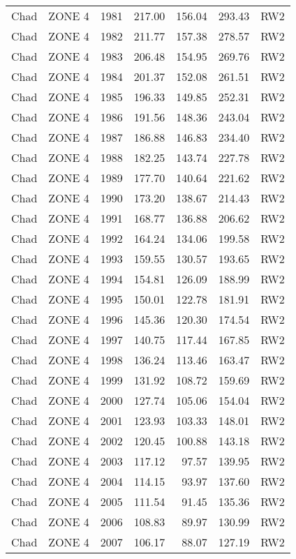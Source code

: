 \begin{longtable}{lllrrrl}
  Chad & ZONE 4 & 1981 & 217.00 & 156.04 & 293.43 & RW2 \\ 
  Chad & ZONE 4 & 1982 & 211.77 & 157.38 & 278.57 & RW2 \\ 
  Chad & ZONE 4 & 1983 & 206.48 & 154.95 & 269.76 & RW2 \\ 
  Chad & ZONE 4 & 1984 & 201.37 & 152.08 & 261.51 & RW2 \\ 
  Chad & ZONE 4 & 1985 & 196.33 & 149.85 & 252.31 & RW2 \\ 
  Chad & ZONE 4 & 1986 & 191.56 & 148.36 & 243.04 & RW2 \\ 
  Chad & ZONE 4 & 1987 & 186.88 & 146.83 & 234.40 & RW2 \\ 
  Chad & ZONE 4 & 1988 & 182.25 & 143.74 & 227.78 & RW2 \\ 
  Chad & ZONE 4 & 1989 & 177.70 & 140.64 & 221.62 & RW2 \\ 
  Chad & ZONE 4 & 1990 & 173.20 & 138.67 & 214.43 & RW2 \\ 
  Chad & ZONE 4 & 1991 & 168.77 & 136.88 & 206.62 & RW2 \\ 
  Chad & ZONE 4 & 1992 & 164.24 & 134.06 & 199.58 & RW2 \\ 
  Chad & ZONE 4 & 1993 & 159.55 & 130.57 & 193.65 & RW2 \\ 
  Chad & ZONE 4 & 1994 & 154.81 & 126.09 & 188.99 & RW2 \\ 
  Chad & ZONE 4 & 1995 & 150.01 & 122.78 & 181.91 & RW2 \\ 
  Chad & ZONE 4 & 1996 & 145.36 & 120.30 & 174.54 & RW2 \\ 
  Chad & ZONE 4 & 1997 & 140.75 & 117.44 & 167.85 & RW2 \\ 
  Chad & ZONE 4 & 1998 & 136.24 & 113.46 & 163.47 & RW2 \\ 
  Chad & ZONE 4 & 1999 & 131.92 & 108.72 & 159.69 & RW2 \\ 
  Chad & ZONE 4 & 2000 & 127.74 & 105.06 & 154.04 & RW2 \\ 
  Chad & ZONE 4 & 2001 & 123.93 & 103.33 & 148.01 & RW2 \\ 
  Chad & ZONE 4 & 2002 & 120.45 & 100.88 & 143.18 & RW2 \\ 
  Chad & ZONE 4 & 2003 & 117.12 & 97.57 & 139.95 & RW2 \\ 
  Chad & ZONE 4 & 2004 & 114.15 & 93.97 & 137.60 & RW2 \\ 
  Chad & ZONE 4 & 2005 & 111.54 & 91.45 & 135.36 & RW2 \\ 
  Chad & ZONE 4 & 2006 & 108.83 & 89.97 & 130.99 & RW2 \\ 
  Chad & ZONE 4 & 2007 & 106.17 & 88.07 & 127.19 & RW2 \\ 

\end{longtable}
